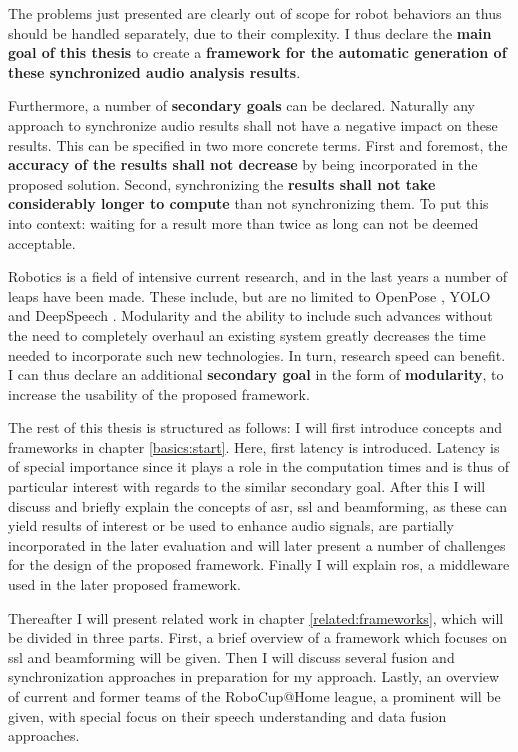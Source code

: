 The problems just presented are clearly out of scope for robot behaviors an thus should be handled separately, due to their complexity.
I thus declare the \textbf{main goal of this thesis} to create a \textbf{framework for the automatic generation of these synchronized audio analysis results}.

Furthermore, a number of \textbf{secondary goals} can be declared.
Naturally any approach to synchronize audio results shall not have a negative impact on these results.
This can be specified in two more concrete terms.
First and foremost, the \textbf{accuracy of the results shall not decrease} by being incorporated in the proposed solution.
Second, synchronizing the \textbf{results shall not take considerably longer to compute} than not synchronizing them.
To put this into context: waiting for a result more than twice as long can not be deemed acceptable.


Robotics is a field of intensive current research, and in the last years a number of leaps have been made.
These include, but are no limited to OpenPose \cite{cao2018openpose}, YOLO \cite{yolov3} and DeepSpeech \cite{deepspeech}.
Modularity and the ability to include such advances without the need to completely overhaul an existing system greatly decreases the time needed to incorporate such new technologies.
In turn, research speed can benefit.
I can thus declare an additional \textbf{secondary goal} in the form of \textbf{modularity}, to increase the usability of the proposed framework.


The rest of this thesis is structured as follows:
I will first introduce concepts and frameworks in chapter \ref{basics:start}.
Here, first latency is introduced.
Latency is of special importance since it  plays a role in the computation times and is thus of particular interest with regards to the similar secondary goal.
After this I will discuss and briefly explain the concepts of \gls{asr}, \gls{ssl} and beamforming, as these can yield results of interest or be used to enhance audio signals, are partially incorporated in the later evaluation and will later present a number of challenges for the design of the proposed framework.
Finally I will explain \gls{ros}, a middleware used in the later proposed framework.

Thereafter I will present related work in chapter \ref{related:frameworks}, which will be divided in three parts.
First, a brief overview of a framework which focuses on \gls{ssl} and beamforming will be given.
Then I will discuss several fusion and synchronization approaches in preparation for my approach.
Lastly, an overview of current and former teams of the RoboCup@Home league, a prominent will be given, with special focus on their speech understanding and data fusion approaches.

